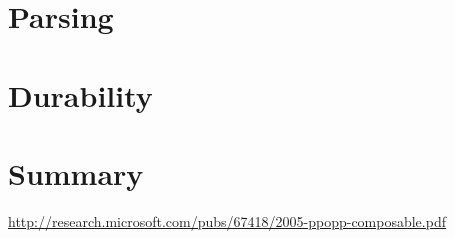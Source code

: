 \documentclass[10pt]{article}
\begin{document}
\begin{multicols}{2}
\section{Parsing}

\section{Durability}

\section{Summary}


\end{multicols}

\begin{thebibliography}{11}

 \url{http://research.microsoft.com/pubs/67418/2005-ppopp-composable.pdf}

\end{thebibliography}
\end{document}

